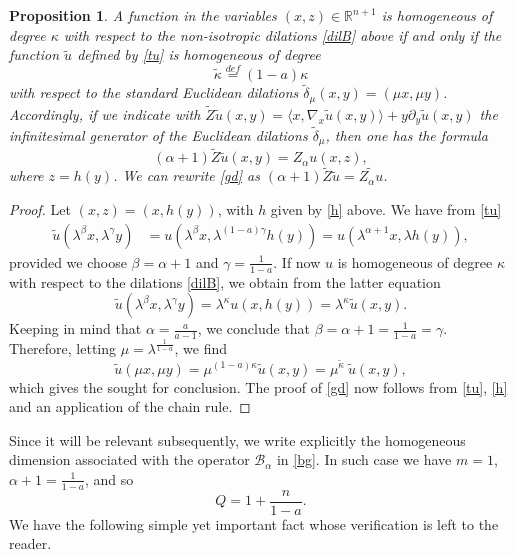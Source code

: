 \documentclass[11pt]{amsart}
\theoremstyle{plain}
\newtheorem{prop}[thrm]{Proposition}
\numberwithin{equation}{section}
\begin{document}
\begin{prop}\label{P:hom}
A function in the variables $(x,z)\in {\mathbb R}^{n+1}$ is homogeneous of degree $\kappa$ with respect to the non-isotropic dilations \eqref{dilB} above if and only if the function $\tilde u$ defined by \eqref{tu} is homogeneous of degree
\begin{equation}\label{tk}
\tilde \kappa \overset{def}{=} (1-a)\kappa
\end{equation} with respect to the standard Euclidean dilations $\tilde \delta_\mu(x,y) = (\mu x,\mu y)$. Accordingly, if we indicate with $\tilde Z \tilde u(x,y) = \langle x,\nabla_x \tilde u(x,y)\rangle + y {\partial}_y \tilde u(x,y)$ the infinitesimal generator of the Euclidean dilations $\tilde \delta_\mu$,  then one has the formula
\begin{equation}\label{gd}
(\alpha + 1) \tilde Z \tilde u(x,y) = Z_\alpha u(x,z),
\end{equation}
where $z = h(y)$. We can rewrite \eqref{gd} as $(\alpha + 1) \tilde Z \tilde u = \widetilde{Z_\alpha u}$.
\end{prop}

\begin{proof}
Let $(x,z) = (x,h(y))$, with $h$ given by \eqref{h} above. We have from \eqref{tu}
\begin{align*}
\tilde u(\lambda^\beta x, \lambda^\gamma y) & = u(\lambda^\beta x,\lambda^{(1-a)\gamma} h(y)) = u(\lambda^{\alpha+1}x,\lambda h(y)),
\end{align*}
provided we choose $\beta = \alpha +1$ and $\gamma = \frac{1}{1-a}$. If now $u$ is homogeneous of degree $\kappa$ with respect to the dilations \eqref{dilB}, we obtain from the latter equation
\[
\tilde u(\lambda^\beta x, \lambda^\gamma y) = \lambda^\kappa u(x,h(y)) = \lambda^\kappa \tilde u(x,y).
\]
Keeping in mind that $\alpha = \frac{a}{a-1}$, we conclude that $\beta = \alpha + 1 = \frac{1}{1-a} = \gamma$. Therefore, letting $\mu = \lambda^{\frac{1}{1-a}}$, we find
\[
\tilde u(\mu x,\mu y) = \mu^{(1-a)\kappa} \tilde u(x,y) = \mu^{\tilde \kappa}\ \tilde u(x,y),
\]
which gives the sought for conclusion. The proof of \eqref{gd} now follows from \eqref{tu}, \eqref{h} and an application of the chain rule.

\end{proof}

Since it will be relevant subsequently, we write explicitly the homogeneous dimension associated with the operator ${\mathcal{B}_\alpha}$ in \eqref{bg}. In such case we have $m = 1$, $\alpha + 1 = \frac{1}{1-a}$, and so
\begin{equation}\label{hd}
Q = 1 + \frac{n}{1-a}.
\end{equation}
We have the following simple yet important fact whose verification is left to the reader.
\end{document}

